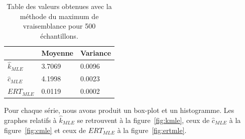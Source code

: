 \begin{table}[!ht]
\centering
\begin{tabular}{|l|l|l|}
\hline
				& Moyenne 	& Variance\\
\hline
$\hat{k}_{MLE}$ & 3.7069 	& 0.0096\\
$\hat{c}_{MLE}$ & 4.1998 	& 0.0023\\
$ERT_{MLE}$			& 0.0119	& 0.0002\\
\hline
\end{tabular}
\caption{Table des valeurs obtenues avec la méthode du maximum de vraisemblance pour 500 échantillons.}
\label{table:mle}
\end{table}

Pour chaque série, nous avons produit un box-plot et un histogramme. Les graphes relatifs à $\hat{k}_{MLE}$ se retrouvent à la figure~\ref{fig:kmle}, ceux de $\hat{c}_{MLE}$ à la figure~\ref{fig:cmle} et ceux de $ERT_{MLE}$ à la figure~\ref{fig:ertmle}.


